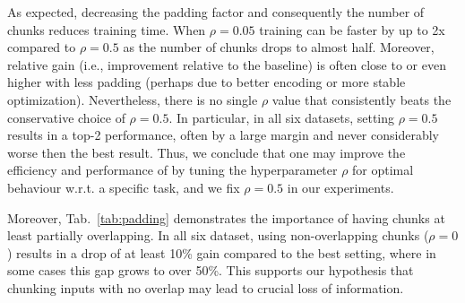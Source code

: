 As expected, decreasing the padding factor and consequently the number of chunks reduces training time. When $\rho=0.05$ training can be faster by up to 2x compared to $\rho=0.5$ as the number of chunks drops to almost half. 
Moreover, relative gain (i.e., improvement relative to the baseline) is often close to or even higher with less padding (perhaps due to better encoding or more stable optimization). Nevertheless, there is no single $\rho$ value that consistently beats the conservative choice of $\rho=0.5$. In particular, in all six datasets, setting $\rho=0.5$ results in a top-2 performance, often by a large margin and never considerably worse then the best result.
Thus, we conclude that one may improve the efficiency and performance of \sled{} by tuning the hyperparameter $\rho$ for optimal behaviour w.r.t. a specific task, and we fix $\rho=0.5$ in our experiments.

Moreover, Tab.~\ref{tab:padding} demonstrates the importance of having chunks at least partially overlapping. In all six dataset, using non-overlapping chunks ($\rho=0$) results in a drop of at least 10\% gain compared to the best setting, where in some cases this gap grows to over 50\%. This supports our hypothesis that chunking inputs with no overlap may lead to crucial loss of information.

\begin{table}[th]
\footnotesize
\addtolength{\tabcolsep}{-3pt}
\centering
{}
\caption{\bartbase{}-\sled{} relative improvement compared to \bartbase{} when varying the padding percentage ($\rho$).
In all cases the maximum input length is 16K and $c=256$. Relative gain is measured w.r.t. Rouge-2 for GovReport, SummScreenFD and QMSum, F$_1$ for Qasper and NarrativeQA and exact match for ContractNLI. In each column, \textbf{boldface} marks the top performing value and \underline{underline} the second-best.}
\label{tab:padding}
\end{table}

 

